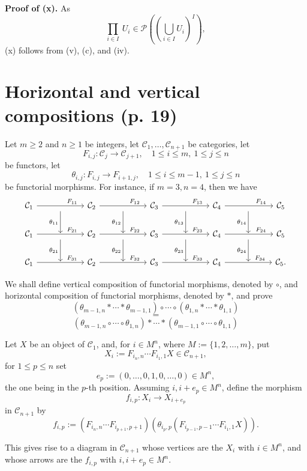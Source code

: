 \documentclass[12pt]{article}
\theoremstyle{remark}%
\newcommand{\n}{\noindent}
\newcommand{\C}{\mathcal C}
\begin{document}
\n\textbf{Proof of (x).} As 
$$
\prod_{i\in I}\ U_i\in\mathcal P\left(\left(\bigcup_{i\in I}U_i\right)^I\right),
$$
(x) follows from (v), (c), and (iv). 
%
\section{Horizontal and vertical compositions (p. 19)}%
%
Let $m\ge2$ and $n\ge1$ be integers, let $\C_1,\dots,\C_{n+1}$ be categories, let 
$$
F_{i,j}:\C_j\to\C_{j+1},\quad1\le i\le m,\ 1\le j\le n
$$
be functors, let 
$$
\theta_{i,j}:F_{i,j}\to F_{i+1,j},\quad1\le i\le m-1,\ 1\le j\le n
$$
be functorial morphisms. For instance, if $m=3,n=4$, then we have 
$$
\begin{tikzcd}
%
\C_1\ar{rr}{}[near end]{F_{11}}&\ar{d}[swap]{\theta_{11}}&\C_2\ar{rr}{}[near end]{F_{12}}&\ar{d}[swap]{\theta_{12}}&\C_3\ar{rr}{}[near end]{F_{13}}&\ar{d}[swap]{\theta_{13}}&\C_4\ar{rr}{}[near end]{F_{14}}&\ar{d}[swap]{\theta_{14}}&\C_5\\ 
%
\C_1\ar{rr}{}[near end]{F_{21}}&{}\ar{d}[swap]{\theta_{21}}&\C_2\ar{rr}{}[near end]{F_{22}}&{}\ar{d}[swap]{\theta_{22}}&\C_3\ar{rr}{}[near end]{F_{23}}&{}\ar{d}[swap]{\theta_{23}}&\C_4\ar{rr}{}[near end]{F_{24}}&{}\ar{d}[swap]{\theta_{24}}&\C_5\\ 
%
\C_1\ar{rr}{}[near end]{F_{31}}&{}&\C_2\ar{rr}{}[near end]{F_{32}}&{}&\C_3\ar{rr}{}[near end]{F_{33}}&{}&\C_4\ar{rr}{}[near end]{F_{34}}&{}&\C_5.
\end{tikzcd}
$$ 

We shall define vertical composition of functorial morphisms, denoted by $\circ$, and horizontal composition of functorial morphisms, denoted by $*$, and prove 
$$
(\theta_{m-1,n}*\cdots*\theta_{m-1,1})\circ\cdots\circ(\theta_{1,n}*\cdots*\theta_{1,1})
$$ 
$$=$$
$$
(\theta_{m-1,n}\circ\cdots\circ\theta_{1,n})*\cdots*(\theta_{m-1,1}\circ\cdots\circ\theta_{1,1})
$$

Let $X$ be an object of $\C_1$, and, for $i\in M^n$, where $M:=\{1,2,\dots,m\}$, put 
$$
X_i:=F_{i_n,n}\cdots F_{i_1,1}X\in\C_{n+1},
$$
for $1\le p\le n$ set 
$$
e_p:=(0,\dots,0,1,0,\dots,0)\in M^n,
$$
the one being in the $p$-th position. Assuming $i,i+e_p\in M^n$, define the morphism 
$$
f_{i,p}:X_i\to X_{i+e_p}
$$
in $\C_{n+1}$ by 
$$
f_{i,p}:=(F_{i_n,n}\cdots F_{i_{p+1},p+1})(\theta_{i_p,p}(F_{i_{p-1},p-1}\cdots F_{i_1,1}X)).
$$

This gives rise to a diagram in $\C_{n+1}$ whose vertices are the $X_i$ with $i\in M^n$, and whose arrows are the $f_{i,p}$ with $i,i+e_p\in M^n$. 
\end{document}
